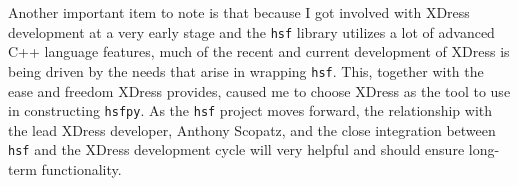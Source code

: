     Another important item to note is that because I got involved with XDress development at a very early stage and the \texttt{hsf} library utilizes a lot of advanced C++ language features, much of the recent and current development of XDress is being driven by the needs that arise in wrapping \texttt{hsf}. This, together with the ease and freedom XDress provides, caused me to choose XDress as the tool to use in constructing \texttt{hsfpy}. As the \texttt{hsf} project moves forward, the relationship with the lead XDress developer, Anthony Scopatz, and the close integration between \texttt{hsf} and the XDress development cycle will very helpful and should ensure long-term functionality.
